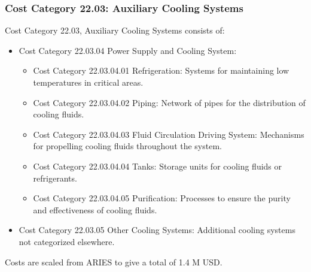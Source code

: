 \subsubsection{Cost Category 22.03: Auxiliary Cooling Systems}

Cost Category 22.03, Auxiliary Cooling Systems consists of:

\begin{itemize}
    \item Cost Category 22.03.04 Power Supply and Cooling System: 
    \begin{itemize}
        \item Cost Category 22.03.04.01 Refrigeration: Systems for maintaining low temperatures in critical areas.
        \item Cost Category 22.03.04.02 Piping: Network of pipes for the distribution of cooling fluids.
        \item Cost Category 22.03.04.03 Fluid Circulation Driving System: Mechanisms for propelling cooling fluids throughout the system.
        \item Cost Category 22.03.04.04 Tanks: Storage units for cooling fluids or refrigerants.
        \item Cost Category 22.03.04.05 Purification: Processes to ensure the purity and effectiveness of cooling fluids.
    \end{itemize}
    \item Cost Category 22.03.05 Other Cooling Systems: Additional cooling systems not categorized elsewhere.
\end{itemize}




Costs are scaled from ARIES to give a total of 1.4 M USD.